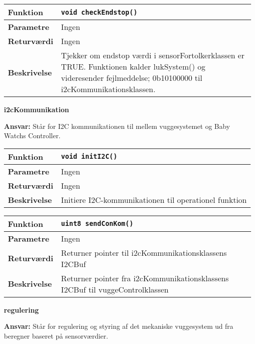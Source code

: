 \begin{center}
    \begin{tabular}{ | l | p{} |}
    \hline
    \textbf{Funktion}	& \verb+void checkEndstop() +						\\ \hline
    \textbf{Parametre} 	& Ingen		\\ \hline
    \textbf{Returværdi}	& Ingen 								\\ \hline
    \textbf{Beskrivelse}	& Tjekker om endstop værdi i sensorFortolkerklassen er TRUE. Funktionen kalder lukSystem() og videresender fejlmeddelse; 0b10100000 til i2cKommunikationsklassen.		\\ \hline
    \end{tabular}
\end{center}


{\centering
\textbf{i2cKommunikation}\par
}
\textbf{Ansvar:} Står for I2C kommunikationen til mellem vuggesystemet og Baby Watchs Controller. \

\begin{center}
    \begin{tabular}{ | l | p{} |}
    \hline
    \textbf{Funktion}	& \verb+void initI2C() +									\\ \hline
    \textbf{Parametre} 	& Ingen														\\ \hline
    \textbf{Returværdi}	& Ingen 													\\ \hline
    \textbf{Beskrivelse}	& Initiere I2C-kommunikationen til operationel funktion	\\ \hline
    \end{tabular}
\end{center}

\begin{center}
    \begin{tabular}{ | l | p{} |}
    \hline
    \textbf{Funktion}	& \verb+uint8 sendConKom() +								\\ \hline
    \textbf{Parametre} 	& Ingen														\\ \hline
    \textbf{Returværdi}	& Returner pointer til i2cKommunikationsklassens I2CBuf											\\ \hline
    \textbf{Beskrivelse}	& Returner pointer fra i2cKommunikationsklassens I2CBuf til vuggeControlklassen	\\ \hline
    \end{tabular}
\end{center}

{\centering
\textbf{regulering}\par
}
\textbf{Ansvar:} Står for regulering og styring af det mekaniske vuggesystem ud fra beregner baseret på sensorværdier. \

